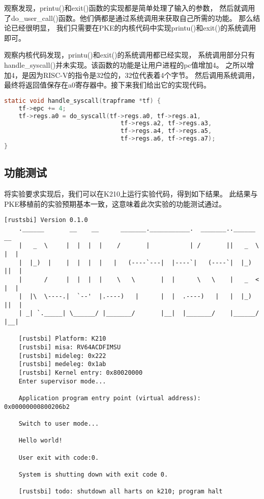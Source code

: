 观察发现，printu()和exit()函数的实现都是简单处理了输入的参数，
然后就调用了do\_user\_call()函数。他们俩都是通过系统调用来获取自己所需的功能。
那么结论已经很明显，
我们只需要在PKE的内核代码中实现printu()和exit()的系统调用即可。

观察内核代码发现，printu()和exit()的系统调用都已经实现，
系统调用部分只有handle\_syscall()并未实现。该函数的功能是让用户进程的pc值增加4。
之所以增加4，是因为RISC-V的指令是32位的，32位代表着4个字节。
然后调用系统调用，最终将返回值保存在a0寄存器中。接下来我们给出它的实现代码。

\begin{lstlisting}[caption={handle\_syscall的实现}, label={lst:handle_syscall}, language=C]
static void handle_syscall(trapframe *tf) {
    tf->epc += 4;
    tf->regs.a0 = do_syscall(tf->regs.a0, tf->regs.a1,
                                tf->regs.a2, tf->regs.a3, 
                                tf->regs.a4, tf->regs.a5, 
                                tf->regs.a6, tf->regs.a7);
}
\end{lstlisting}

\subsection{功能测试}

将实验要求实现后，我们可以在K210上运行实验代码，得到如下结果。
此结果与PKE移植前的实验预期基本一致，这意味着此次实验的功能测试通过。


\begin{lstlisting}[caption={lab1实验结果（移植K210后）}, label={lst:lab1_result}]
    [rustsbi] Version 0.1.0
    .______       __    __      _______.___________.  _______..______   __
    |   _  \     |  |  |  |    /       |           | /       ||   _  \ |  |
    |  |_)  |    |  |  |  |   |   (----`---|  |----`|   (----`|  |_)  ||  |
    |      /     |  |  |  |    \   \       |  |      \   \    |   _  < |  |
    |  |\  \----.|  `--'  |.----)   |      |  |  .----)   |   |  |_)  ||  |
    | _| `._____| \______/ |_______/       |__|  |_______/    |______/ |__|
    
    [rustsbi] Platform: K210
    [rustsbi] misa: RV64ACDFIMSU
    [rustsbi] mideleg: 0x222
    [rustsbi] medeleg: 0x1ab
    [rustsbi] Kernel entry: 0x80020000
    Enter supervisor mode...
    
    Application program entry point (virtual address): 0x00000000800206b2
    
    Switch to user mode...
    
    Hello world!
    
    User exit with code:0.
    
    System is shutting down with exit code 0.
    
    [rustsbi] todo: shutdown all harts on k210; program halt
        
\end{lstlisting}

